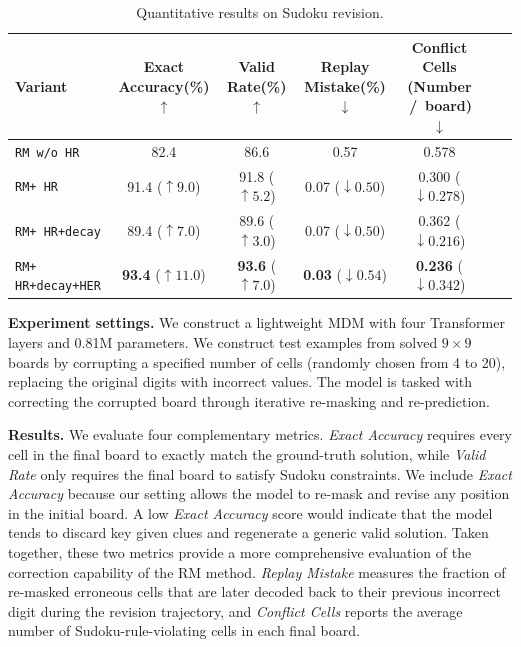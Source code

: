 \documentclass{llmxive}
\providecommand{\method}{RM\xspace}
\providecommand{\temporalmethod}{HR\xspace}
\providecommand{\distancemethod}{HER\xspace}
\begin{document}
\begin{table}[htbp]
\centering
\scriptsize
\setlength{\tabcolsep}{3pt}
\begin{tabular}{lcccccc}

\toprule
Variant & Exact Accuracy(\%) $\uparrow$ & Valid Rate(\%) $\uparrow$ & Replay Mistake(\%) $\downarrow$ & Conflict Cells (Number \,/\, board) $\downarrow$ \\
\midrule
\texttt{\method w/o \temporalmethod} & 82.4 & 86.6 & 0.57 & 0.578 \\
\texttt{\method + \temporalmethod} & 91.4 ($\uparrow 9.0$) & 91.8 ($\uparrow 5.2$) & 0.07 ($\downarrow 0.50$) & 0.300 ($\downarrow 0.278$) \\
\texttt{\method + \temporalmethod+\;decay} & 89.4 ($\uparrow 7.0$) & 89.6 ($\uparrow 3.0$) & 0.07 ($\downarrow 0.50$) & 0.362 ($\downarrow 0.216$) \\
\texttt{\method + \temporalmethod+\;decay\;+\;\distancemethod} & \textbf{93.4} ($\uparrow 11.0$) & \textbf{93.6} ($\uparrow 7.0$) & \textbf{0.03} ($\downarrow 0.54$) & \textbf{0.236} ($\downarrow 0.342$) \\
\bottomrule
\end{tabular}

\label{tab:sudoku-ablation-components}
\caption{
Quantitative results on Sudoku revision.
}
\end{table}

\textbf{Experiment settings.}
We construct a lightweight MDM with four Transformer layers and 0.81M parameters. We construct test examples from solved $9\times9$ boards by corrupting a specified number of cells (randomly chosen from 4 to 20), replacing the original digits with incorrect values. The model is tasked with correcting the corrupted board through iterative re-masking and re-prediction.

\textbf{Results.}
We evaluate four complementary metrics.
\textit{Exact Accuracy} requires every cell in the final board to exactly match the ground-truth solution, while \textit{Valid Rate} only requires the final board to satisfy Sudoku constraints.
We include \textit{Exact Accuracy} because our setting allows the model to re-mask and revise any position in the initial board. A low \textit{Exact Accuracy} score would indicate that the model tends to discard key given clues and regenerate a generic valid solution. Taken together, these two metrics provide a more comprehensive evaluation of the correction capability of the RM method.
\textit{Replay Mistake} measures the fraction of re-masked erroneous cells that are later decoded back to their previous incorrect digit during the revision trajectory, and \textit{Conflict Cells} reports the average number of Sudoku-rule-violating cells in each final board.
\end{document}
